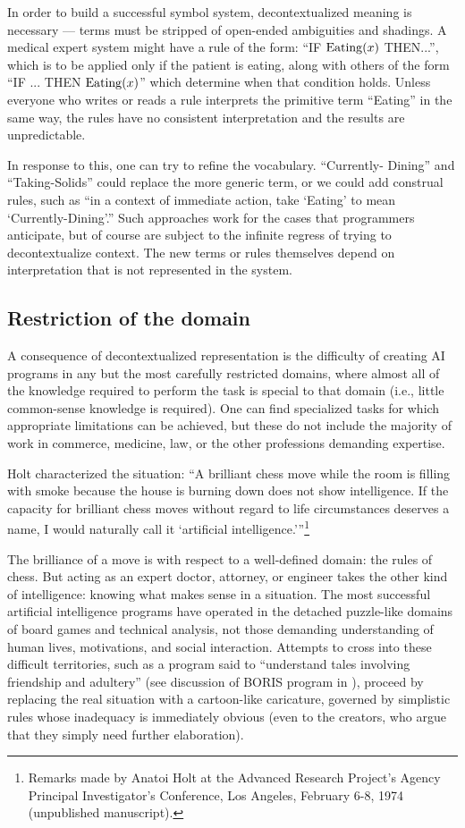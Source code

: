 \documentclass[12pt]{article}
\begin{document}
In order to build a successful symbol system, decontextualized meaning is necessary --- terms must be stripped of open-ended ambiguities and shadings. A medical expert system might have a rule of the form: ``IF $\mathop{\rm Eating}(x)$ THEN...'', which is to be applied only if the patient is eating, along with others of the form ``IF ... THEN $\mathop{\rm Eating}(x)$'' which determine when that condition holds. Unless everyone who writes or reads a rule interprets the primitive term ``Eating'' in the same way, the rules have no consistent interpretation and the results are unpredictable.

In response to this, one can try to refine the vocabulary. ``Currently- Dining'' and ``Taking-Solids'' could replace the more generic term, or we could add construal rules, such as ``in a context of immediate action, take `Eating' to mean `Currently-Dining'.'' Such approaches work for the cases that programmers anticipate, but of course are subject to the infinite regress of trying to decontextualize context. The new terms or rules themselves depend on interpretation that is not represented in the system.

\subsection{Restriction of the domain}

A consequence of decontextualized representation is the difficulty of creating AI programs in any but the most carefully restricted domains, where almost all of the knowledge required to perform the task is special to that domain (i.e., little common-sense knowledge is required). One can find specialized tasks for which appropriate limitations can be achieved, but these do not include the majority of work in commerce, medicine, law, or the other professions demanding expertise.

Holt characterized the situation: ``A brilliant chess move while the room is filling with smoke because the house is burning down does not show intelligence. If the capacity for brilliant chess moves without regard to life circumstances deserves a name, I would naturally call it `artificial intelligence.'''\footnote{Remarks made by Anatoi Holt at the Advanced Research Project's Agency
Principal Investigator's Conference, Los Angeles, February 6-8, 1974
(unpublished manuscript).}

The brilliance of a move is with respect to a well-defined domain: the rules of chess. But acting as an expert doctor, attorney, or engineer takes the other kind of intelligence: knowing what makes sense in a situation. The most successful artificial intelligence programs have operated in the detached puzzle-like domains of board games and technical analysis, not those demanding understanding of human lives, motivations, and social interaction. Attempts to cross into these difficult territories, such as a program said to ``understand tales involving friendship and adultery'' (see discussion of BORIS program in \cite{winograd1986}), proceed by replacing the real situation with a cartoon-like caricature, governed by simplistic rules whose inadequacy is immediately obvious (even to the creators, who argue that they simply need further elaboration).
\end{document}
